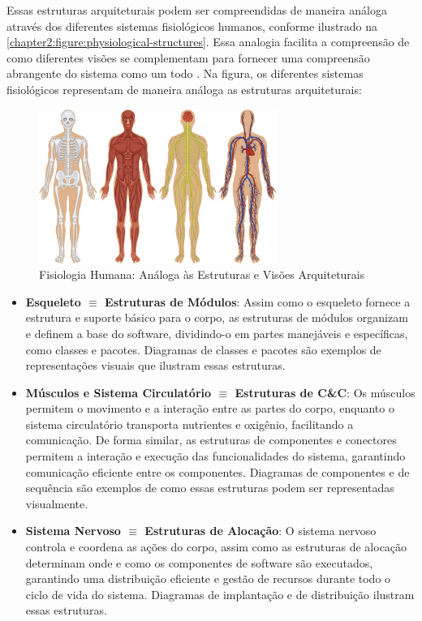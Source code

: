 Essas estruturas arquiteturais podem ser compreendidas de maneira análoga através dos diferentes sistemas fisiológicos humanos, conforme ilustrado na \autoref{chapter2:figure:physiological-structures}. Essa analogia facilita a compreensão de como diferentes visões se complementam para fornecer uma compreensão abrangente do sistema como um todo \cite{Bass2021}. Na figura, os diferentes sistemas fisiológicos representam de maneira análoga as estruturas arquiteturais:

\begin{figure}[htb]
\centering
\caption{Fisiologia Humana: Análoga às Estruturas e Visões Arquiteturais}
\label{chapter2:figure:physiological-structures}
\includegraphics[width=0.69\textwidth]{images/chapter2-arch-physiological-structures.jpeg}
\end{figure}

\begin{itemize}
    \item \textbf{Esqueleto $\equiv$ Estruturas de Módulos}: Assim como o esqueleto fornece a estrutura e suporte básico para o corpo, as estruturas de módulos organizam e definem a base do software, dividindo-o em partes manejáveis e específicas, como classes e pacotes. Diagramas de classes e pacotes são exemplos de representações visuais que ilustram essas estruturas.

    \item \textbf{Músculos e Sistema Circulatório $\equiv$ Estruturas de C\&C}: Os músculos permitem o movimento e a interação entre as partes do corpo, enquanto o sistema circulatório transporta nutrientes e oxigênio, facilitando a comunicação. De forma similar, as estruturas de componentes e conectores permitem a interação e execução das funcionalidades do sistema, garantindo comunicação eficiente entre os componentes. Diagramas de componentes e de sequência são exemplos de como essas estruturas podem ser representadas visualmente.

    \item \textbf{Sistema Nervoso $\equiv$ Estruturas de Alocação}: O sistema nervoso controla e coordena as ações do corpo, assim como as estruturas de alocação determinam onde e como os componentes de software são executados, garantindo uma distribuição eficiente e gestão de recursos durante todo o ciclo de vida do sistema. Diagramas de implantação e de distribuição ilustram essas estruturas.
\end{itemize}

